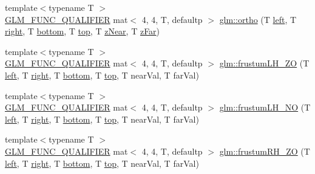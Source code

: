 \begin{DoxyCompactItemize}
\item 
{\footnotesize template$<$typename T $>$ }\\\mbox{\hyperlink{setup_8hpp_a33fdea6f91c5f834105f7415e2a64407}{G\+L\+M\+\_\+\+F\+U\+N\+C\+\_\+\+Q\+U\+A\+L\+I\+F\+I\+ER}} mat$<$ 4, 4, T, defaultp $>$ \mbox{\hyperlink{group__gtc__matrix__transform_ga6615d8a9d39432e279c4575313ecb456}{glm\+::ortho}} (T \mbox{\hyperlink{_s_d_l__opengl__glext_8h_a85b8f6c07fbc1fb5d77c2ae090f21995}{left}}, T \mbox{\hyperlink{_s_d_l__opengl__glext_8h_a5ffadbbacc6b89cf6218bc43b384d3fe}{right}}, T \mbox{\hyperlink{_s_d_l__opengl__glext_8h_a95fc257e5ddf46f7db9d5e898cdf1991}{bottom}}, T \mbox{\hyperlink{_s_d_l__opengl__glext_8h_a5ab323daeacf8dfdb8f91132fecdca23}{top}}, T \mbox{\hyperlink{_s_d_l__opengl__glext_8h_a12d99226e590bbaaf0be69169eeb4834}{z\+Near}}, T \mbox{\hyperlink{_s_d_l__opengl__glext_8h_a1052a8235df129542aea6da80fbec6a1}{z\+Far}})
\item 
{\footnotesize template$<$typename T $>$ }\\\mbox{\hyperlink{setup_8hpp_a33fdea6f91c5f834105f7415e2a64407}{G\+L\+M\+\_\+\+F\+U\+N\+C\+\_\+\+Q\+U\+A\+L\+I\+F\+I\+ER}} mat$<$ 4, 4, T, defaultp $>$ \mbox{\hyperlink{group__gtc__matrix__transform_ga94218b094862d17798370242680b9030}{glm\+::frustum\+L\+H\+\_\+\+ZO}} (T \mbox{\hyperlink{_s_d_l__opengl__glext_8h_a85b8f6c07fbc1fb5d77c2ae090f21995}{left}}, T \mbox{\hyperlink{_s_d_l__opengl__glext_8h_a5ffadbbacc6b89cf6218bc43b384d3fe}{right}}, T \mbox{\hyperlink{_s_d_l__opengl__glext_8h_a95fc257e5ddf46f7db9d5e898cdf1991}{bottom}}, T \mbox{\hyperlink{_s_d_l__opengl__glext_8h_a5ab323daeacf8dfdb8f91132fecdca23}{top}}, T near\+Val, T far\+Val)
\item 
{\footnotesize template$<$typename T $>$ }\\\mbox{\hyperlink{setup_8hpp_a33fdea6f91c5f834105f7415e2a64407}{G\+L\+M\+\_\+\+F\+U\+N\+C\+\_\+\+Q\+U\+A\+L\+I\+F\+I\+ER}} mat$<$ 4, 4, T, defaultp $>$ \mbox{\hyperlink{group__gtc__matrix__transform_ga259520cad03b3f8bca9417920035ed01}{glm\+::frustum\+L\+H\+\_\+\+NO}} (T \mbox{\hyperlink{_s_d_l__opengl__glext_8h_a85b8f6c07fbc1fb5d77c2ae090f21995}{left}}, T \mbox{\hyperlink{_s_d_l__opengl__glext_8h_a5ffadbbacc6b89cf6218bc43b384d3fe}{right}}, T \mbox{\hyperlink{_s_d_l__opengl__glext_8h_a95fc257e5ddf46f7db9d5e898cdf1991}{bottom}}, T \mbox{\hyperlink{_s_d_l__opengl__glext_8h_a5ab323daeacf8dfdb8f91132fecdca23}{top}}, T near\+Val, T far\+Val)
\item 
{\footnotesize template$<$typename T $>$ }\\\mbox{\hyperlink{setup_8hpp_a33fdea6f91c5f834105f7415e2a64407}{G\+L\+M\+\_\+\+F\+U\+N\+C\+\_\+\+Q\+U\+A\+L\+I\+F\+I\+ER}} mat$<$ 4, 4, T, defaultp $>$ \mbox{\hyperlink{group__gtc__matrix__transform_ga7654a9227f14d5382786b9fc0eb5692d}{glm\+::frustum\+R\+H\+\_\+\+ZO}} (T \mbox{\hyperlink{_s_d_l__opengl__glext_8h_a85b8f6c07fbc1fb5d77c2ae090f21995}{left}}, T \mbox{\hyperlink{_s_d_l__opengl__glext_8h_a5ffadbbacc6b89cf6218bc43b384d3fe}{right}}, T \mbox{\hyperlink{_s_d_l__opengl__glext_8h_a95fc257e5ddf46f7db9d5e898cdf1991}{bottom}}, T \mbox{\hyperlink{_s_d_l__opengl__glext_8h_a5ab323daeacf8dfdb8f91132fecdca23}{top}}, T near\+Val, T far\+Val)

\end{DoxyCompactItemize}
